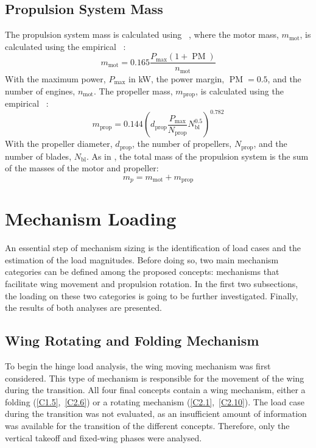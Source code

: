 \subsection{Propulsion System Mass}\label{subsec:Class_II_sizing_Propulsion_System_Mass}
The propulsion system mass is calculated using ~\cite{Ugwueze_Sizing_Method,torenbeek_1982}, where the motor mass, $m_{\text{mot}}$, is calculated using the empirical ~\cite{Ugwueze_Sizing_Method}:
\begin{equation}
    \label{eq:m_motor_classII}
    m_{\text{mot}}=0.165 \frac{P_{\max} (1+\operatorname{PM})}{n_{\text{mot}}}
\end{equation}
With the maximum power, $P_{\max}$ in \unit{kW}, the power margin, $\operatorname{PM}=0.5$, and the number of engines, $n_{\text{mot}}$.
The propeller mass, $m_{\text{prop}}$, is calculated using the empirical ~\cite{Ugwueze_Sizing_Method}:
\begin{equation}
    \label{eq:m_prop_classII}
    m_{\text{prop}}=0.144 \left( d_{\text{prop}} \frac{P_{\max}}{N_{\text{prop}}} N_{\text{bl}}^{0.5} \right)^{0.782}
\end{equation}
With the propeller diameter, $d_{\text{prop}}$, the number of propellers, $N_{\text{prop}}$, and the number of blades, $N_{\text{bl}}$.
As in , the total mass of the propulsion system is the sum of the masses of the motor and propeller:
\begin{equation}
    \label{eq:m_propulsion_classII}
    m_p = m_{\text{mot}} + m_{\text{prop}}
\end{equation}


\section{Mechanism Loading}\label{sec:wing-loading}
\label{sec:Hingeload}
An essential step of mechanism sizing is the identification of load cases and the estimation of the load magnitudes.
Before doing so, two main mechanism categories can be defined among the proposed concepts: mechanisms that facilitate wing movement and propulsion rotation.
In the first two subsections, the loading on these two categories is going to be further investigated.
Finally, the results of both analyses are presented.

\subsection{Wing Rotating and Folding Mechanism}
To begin the hinge load analysis, the wing moving mechanism was first considered.
This type of mechanism is responsible for the movement of the wing during the transition.
All four final concepts contain a wing mechanism, either a folding (\ref{C1.5},~\ref{C2.6}) or a rotating mechanism (\ref{C2.1},~\ref{C2.10}). The load case during the transition was not evaluated, as an insufficient amount of information was available for the transition of the different concepts.
Therefore, only the vertical takeoff and fixed-wing phases were analysed.


